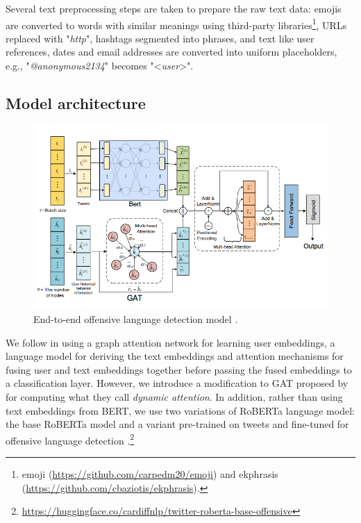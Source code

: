 \documentclass[letterpaper]{article} %
\begin{document}
Several text preprocessing steps are taken to prepare the raw text data: emojis are converted to words with similar meanings using third-party libraries\footnote{emoji (\url{https://github.com/carpedm20/emoji}) and ekphrasis (\url{https://github.com/cbaziotis/ekphrasis}).}, URLs replaced with "\textit{http}", hashtags segmented into phrases, and text like user references, dates and email addresses are converted into uniform placeholders, e.g., "\textit{@anonymous2134}" becomes "\textless\textit{user}\textgreater".

\subsection{Model architecture}

\begin{figure}
    \includegraphics[width=\linewidth]{architecture_diagram.png}
    \caption{End-to-end offensive language detection model \citep{Miao2022}.}
\end{figure}

We follow \citet{Miao2022} in using a graph attention network for learning user embeddings, a language model for deriving the text embeddings and attention mechanisms for fusing user and text embeddings together before passing the fused embeddings to a classification layer. However, we introduce a modification to GAT proposed by \citet{Brody2021} for computing what they call \textit{dynamic attention}. In addition, rather than using text embeddings from BERT, we use two variations of RoBERTa language model: the base RoBERTa model \citep{Devlin2018} and a variant pre-trained on tweets and fine-tuned for offensive language detection \citep{Barbieri2020}.\footnote{\url{https://huggingface.co/cardiffnlp/twitter-roberta-base-offensive}}
\end{document}
